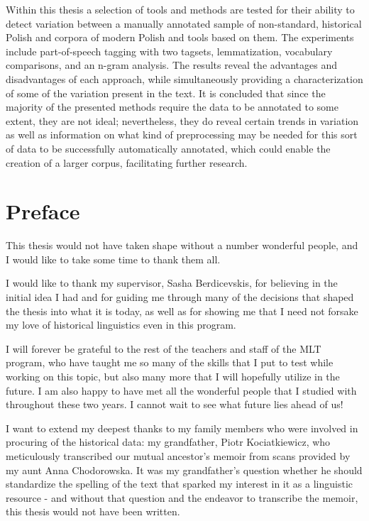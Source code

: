 \documentclass[12pt, a4paper]{article}  %
\begin{document}
Within this thesis a selection of tools and methods are tested for their ability to detect variation between a manually annotated sample of non-standard, historical Polish and corpora of modern Polish and tools based on them. The experiments include part-of-speech tagging with two tagsets, lemmatization, vocabulary comparisons, and an n-gram analysis. The results reveal the advantages and disadvantages of each approach, while simultaneously providing a characterization of some of the variation present in the text. It is concluded that since the majority of the presented methods require the data to be annotated to some extent, they are not ideal; nevertheless, they do reveal certain trends in variation as well as information on what kind of preprocessing may be needed for this sort of data to be successfully automatically annotated, which could enable the creation of a larger corpus, facilitating further research. 

\thispagestyle{empty}

\newpage
\section*{Preface}

This thesis would not have taken shape without a number wonderful people, and I would like to take some time to thank them all.  

I would like to thank my supervisor, Sasha Berdicevskis, for believing in the initial idea I had and for guiding me through many of the decisions that shaped the thesis into what it is today, as well as for showing me that I need not forsake my love of historical linguistics even in this program.

I will forever be grateful to the rest of the teachers and staff of the MLT program, who have taught me so many of the skills that I put to test while working on this topic, but also many more that I will hopefully utilize in the future. I am also happy to have met all the wonderful people that I studied with throughout these two years. I cannot wait to see what future lies ahead of us!

I want to extend my deepest thanks to my family members who were involved in procuring of the historical data: my grandfather, Piotr Kociatkiewicz, who meticulously transcribed our mutual ancestor's memoir from scans provided by my aunt Anna Chodorowska. It was my grandfather's question whether he should standardize the spelling of the text that sparked my interest in it as a linguistic resource - and without that question and the endeavor to transcribe the memoir, this thesis would not have been written.
\end{document}
